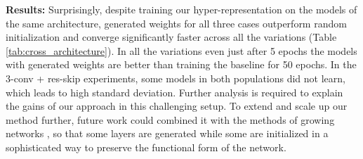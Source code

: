 \documentclass{article}
\begin{document}
\textbf{Results:} Surprisingly, despite training our hyper-representation on the models of the same architecture, generated weights for all three cases outperform random initialization and converge significantly faster across all the variations (Table \ref{tab:cross_architecture}). In all the variations even just after 5 epochs the models with generated weights are better than training the baseline for 50 epochs. 
In the 3-conv + res-skip experiments, some models in both populations did not learn, which leads to high standard deviation. 
Further analysis is required to explain the gains of our approach in this challenging setup. 
To extend and scale up our method further, future work could combined it with the methods of growing networks \citep{chenNet2NetAcceleratingLearning2016,wangRecurrentParameterGenerators2021}, so that some layers are generated while some are initialized in a sophisticated way to preserve the functional form of the network.
\end{document}

